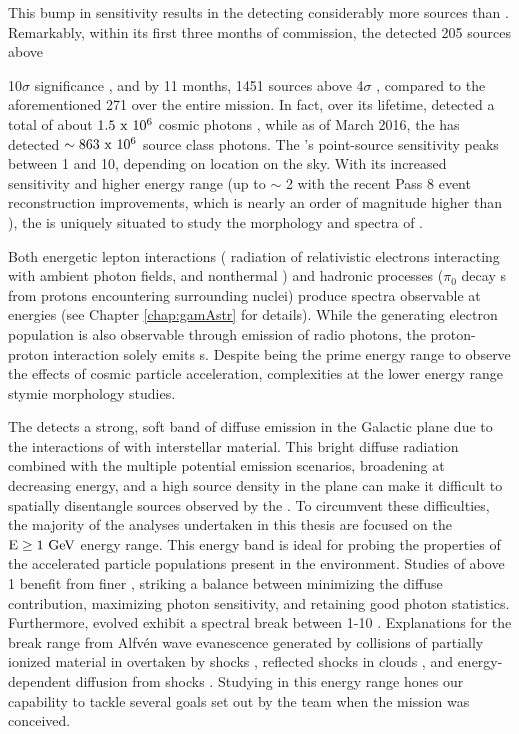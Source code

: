 This bump in sensitivity results in the \lat{} detecting considerably more sources than \egret. Remarkably, within its first three months of commission, the \lat{} detected 205 sources above {\rm 10$\sigma$ significance \citep{lat_3m}, and by 11 months, 1451 sources above 4$\sigma$ \citep{1FGL}, compared to  the aforementioned 271 over the entire \egret{} mission. In fact, over its lifetime, \egret{} detected a total of about ${\rm 1.5~x~10^6}$ cosmic photons \citep{Thomson93}, while as of March 2016, the \lat{} has detected ${\rm \sim 863~x~10^6}$  source class photons. The \lat's point-source sensitivity peaks between 1 and 10\gev{}, depending on location on the sky. With its increased sensitivity and higher energy range (up to $\sim$ 2\tev{} with the recent Pass 8 event reconstruction improvements, which is nearly an order of magnitude higher than \egret{}), the \lat{} is uniquely situated to study the \gam{} morphology and spectra of \snrs{}.
	
Both energetic lepton interactions (\ie \ic{} radiation of relativistic electrons interacting with ambient photon fields, and nonthermal \brems{}) and hadronic processes ($\pi_0$ decay \gam{}s from \cray{} protons encountering surrounding nuclei) produce spectra observable at \gam{} energies (see Chapter \ref{chap:gamAstr} for details). While the \ic{} generating electron population is also observable through emission of radio \sync{} photons, the proton-proton interaction solely emits \gam{}s. Despite being the prime energy range to observe the effects of cosmic particle acceleration, complexities at the lower \lat{} energy range stymie \snr{} morphology studies.
	
The \lat{} detects a strong, soft band of diffuse emission in the Galactic plane due to the interactions of  \crs{} with interstellar material. This bright diffuse radiation combined with the multiple potential emission scenarios, broadening \psf{} at decreasing energy, and a high source density in the plane can make it difficult to spatially disentangle sources observed by the \lat{}. To circumvent these 
difficulties, the majority of the analyses undertaken in this thesis are focused on the ${\rm E \geq 1~\mathrm{GeV}}$ energy range. This energy band is ideal for probing the properties of the accelerated particle populations present in the \snr{} environment. Studies of  \snrs{}  above 1\gev{} benefit from finer \lat{} \psf{}, striking a balance between minimizing the diffuse contribution, maximizing photon sensitivity, and retaining good photon statistics. Furthermore, evolved \snrs{}  exhibit a spectral break between 1-10\gev{} \citep{Hewitt15}. Explanations for the break range from Alfv\' en wave evanescence generated by collisions of partially ionized material in \mcs{} overtaken by \snr{}  shocks \citep{Malkov11}, reflected shocks in clouds \cite{Inoue10c}, and energy-dependent diffusion from shocks \cite{Ohira11}. Studying \snrs{} in this energy range hones our capability to tackle several goals set out by the \Fermi{} team when the mission was conceived.

}
